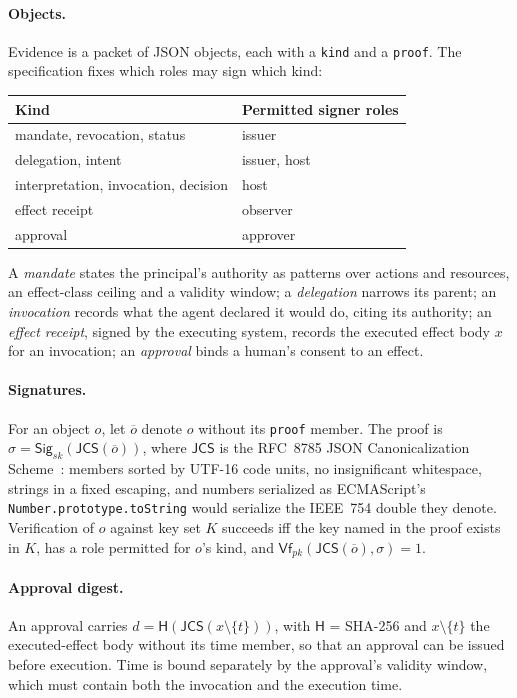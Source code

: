 \documentclass[11pt,a4paper]{article}
\theoremstyle{definition}
\theoremstyle{remark}
\newcommand{\code}[1]{\texttt{#1}}
\newcommand{\Canon}{\mathsf{JCS}}
\newcommand{\Hash}{\mathsf{H}}
\newcommand{\Sig}{\mathsf{Sig}}
\newcommand{\Vf}{\mathsf{Vf}}
\begin{document}
\paragraph{Objects.} Evidence is a packet of JSON objects, each with a \code{kind} and a \code{proof}. The specification fixes which roles may sign which kind:
\begin{center}
\begin{tabular}{@{}ll@{}}
\toprule
Kind & Permitted signer roles \\
\midrule
mandate, revocation, status & issuer \\
delegation, intent & issuer, host \\
interpretation, invocation, decision & host \\
effect receipt & observer \\
approval & approver \\
\bottomrule
\end{tabular}
\end{center}
A \emph{mandate} states the principal's authority as patterns over actions and resources, an effect-class ceiling and a validity window; a \emph{delegation} narrows its parent; an \emph{invocation} records what the agent declared it would do, citing its authority; an \emph{effect receipt}, signed by the executing system, records the executed effect body $x$ for an invocation; an \emph{approval} binds a human's consent to an effect.

\paragraph{Signatures.} For an object $o$, let $\overline{o}$ denote $o$ without its \code{proof} member. The proof is $\sigma = \Sig_{sk}(\Canon(\overline{o}))$, where $\Canon$ is the RFC~8785 JSON Canonicalization Scheme~\cite{rfc8785}: members sorted by UTF-16 code units, no insignificant whitespace, strings in a fixed escaping, and numbers serialized as ECMAScript's \code{Number.prototype.toString} would serialize the IEEE~754 double they denote. Verification of $o$ against key set $K$ succeeds iff the key named in the proof exists in $K$, has a role permitted for $o$'s kind, and $\Vf_{pk}(\Canon(\overline{o}), \sigma) = 1$.

\paragraph{Approval digest.} An approval carries $d = \Hash(\Canon(x \setminus \{t\}))$, with $\Hash$ = SHA-256 and $x \setminus \{t\}$ the executed-effect body without its time member, so that an approval can be issued before execution. Time is bound separately by the approval's validity window, which must contain both the invocation and the execution time.
\end{document}
